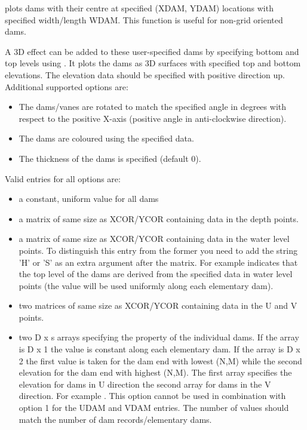  plots dams with their centre at specified (XDAM, YDAM) locations with specified width/length WDAM.
This function is useful for non-grid oriented dams.

A 3D effect can be added to these user-specified dams by specifying bottom and top levels using .
It plots the dams as 3D surfaces with specified top and bottom elevations.
The elevation data should be specified with positive direction up.
Additional supported options are:

\begin{itemize}
\item {}
The dams/vanes are rotated to match the specified angle in degrees with respect to the positive X-axis  (positive angle in anti-clockwise direction).
\item {}
The dams are coloured using the specified data.
\item {}
The thickness of the dams is specified (default 0).
\end{itemize}

Valid entries for all options are:
\begin{itemize}
\item a constant, uniform value for all dams
\item a matrix of same size as XCOR/YCOR containing data in the depth points.
\item a matrix of same size as XCOR/YCOR containing data in the water level points.
To distinguish this entry from the former you need to add the string 'H' or 'S' as an extra argument after the matrix.
For example  indicates that the top level of the dams are derived from the specified data in water level points (the value will be used uniformly along each elementary dam).
\item two matrices of same size as XCOR/YCOR containing data in the U and V points.
\item two D x s arrays specifying the property of the individual dams.
If the array is D x 1 the value is constant along each elementary dam.
If the array is D x 2 the first value is taken for the dam end with lowest (N,M) while the second elevation for the dam end with highest (N,M).
The first array specifies the elevation for dams in U direction the second array for dams in the V direction.
For example .
This option cannot be used in combination with option 1 for the UDAM and VDAM entries.
The number of values should match the number of dam records/elementary dams.
\end{itemize}

